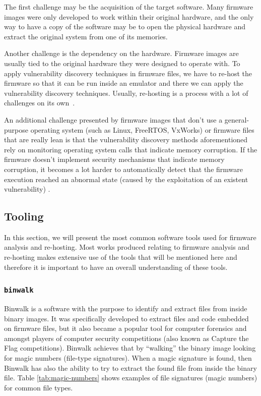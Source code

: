 The first challenge may be the acquisition of the target software. Many firmware images were only developed to work within their original hardware, and the only way to have a copy of the software may be to open the physical hardware and extract the original system from one of its memories.

Another challenge is the dependency on the hardware. Firmware images are usually tied to the original hardware they were designed to operate with. To apply vulnerability discovery techniques in firmware files, we have to re-host the firmware so that it can be run inside an emulator and there we can apply the vulnerability discovery techniques. Usually, re-hosting is a process with a lot of challenges on its own~\cite{firmware-challenges}.

An additional challenge presented by firmware images that don't use a general-purpose operating system (such as Linux, FreeRTOS, VxWorks) or firmware files that are really lean is that the vulnerability discovery methods aforementioned rely on monitoring operating system calls that indicate memory corruption. If the firmware doesn't implement security mechanisms that indicate memory corruption, it becomes a lot harder to automatically detect that the firmware execution reached an abnormal state (caused by the exploitation of an existent vulnerability) \cite{wycinwyc}.

\subsection{Tooling}

In this section, we will present the most common software tools used for firmware analysis and re-hosting. Most works produced relating to firmware analysis and re-hosting makes extensive use of the tools that will be mentioned here and therefore it is important to have an overall understanding of these tools.

\subsubsection{ {\tt binwalk} }

Binwalk \cite{github:binwalk} is a software with the purpose to identify and extract files from inside binary images. It was specifically developed to extract files and code embedded on firmware files, but it also became a popular tool for computer forensics and amongst players of computer security competitions (also known as Capture the Flag competitions). Binwalk achieves that by ``walking'' the binary image looking for magic numbers (file-type signatures). When a magic signature is found, then Binwalk has also the ability to try to extract the found file from inside the binary file. Table \ref{tab:magic-numbers} shows examples of file signatures (magic numbers) for common file types.

